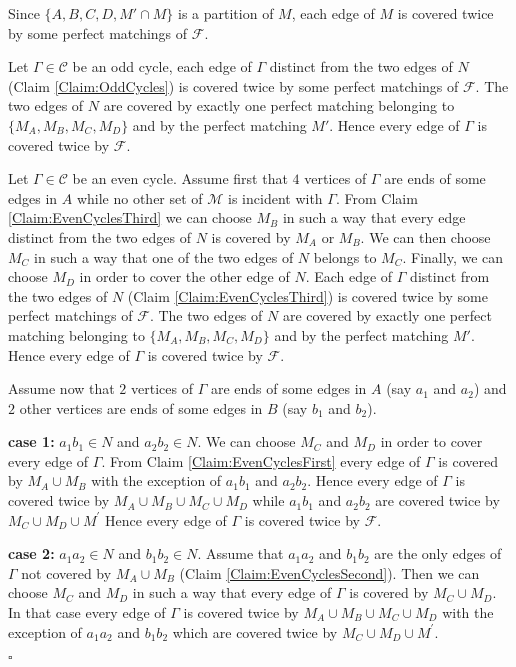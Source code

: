 \documentclass{amsart}
\theoremstyle{definition}
\theoremstyle{remark}
\newenvironment{prf}{{\bf \noindent Proof } }{\hfill$\square$\\}
\begin{document}
\begin{prf}
Since $\{A,B,C,D,M'\cap M\}$ is a partition of $M$, each edge of $M$
is covered twice by some perfect matchings of $\mathcal F$.

Let $\Gamma \in \mathcal C$ be an odd cycle, each edge of $\Gamma$
distinct from the two edges of $N$ (Claim \ref{Claim:OddCycles}) is
covered twice by some perfect matchings of $\mathcal F$. The two
edges of $N$  are covered by exactly one perfect matching belonging
to $\{M_{A},M_{B},M_{C},M_{D}\}$ and by the perfect matching $M'$.
Hence every edge of $\Gamma$ is covered twice by $\mathcal F$.

Let $\Gamma \in \mathcal C$ be an even cycle. Assume first that $4$
vertices of $\Gamma$ are ends of some edges in $A$ while no other
set of $\mathcal M$ is incident with $\Gamma$. From Claim
\ref{Claim:EvenCyclesThird} we can choose $M_{B}$ in such a way that
 every edge distinct from the two edges of $N$  is
covered by  $M_{A}$ or $M_{B}$. We can then choose $M_{C}$ in such a
way that one of the two edges of $N$ belongs to $M_{C}$. Finally, we
can choose $M_{D}$ in order to cover the other edge of $N$. Each
edge of $\Gamma$ distinct from the two edges of $N$ (Claim
 \ref{Claim:EvenCyclesThird}) is
covered twice by some perfect matchings of $\mathcal F$. The two
edges of $N$  are covered by exactly one perfect matching belonging
to $\{M_{A},M_{B},M_{C},M_{D}\}$ and by the perfect matching $M'$.
Hence every edge of $\Gamma$ is covered twice by $\mathcal F$.


Assume now that $2$ vertices of $\Gamma$ are ends of some edges in
$A$ (say $a_{1}$ and $a_{2}$) and $2$ other vertices are ends of
some edges in $B$ (say $b_{1}$ and $b_{2}$).



 {\bf case 1:} $a_{1}b_{1} \in N$ and $a_{2}b_{2} \in N$. We can choose $M_{C}$
and $M_{D}$ in order to cover every edge of $\Gamma$. From Claim
\ref{Claim:EvenCyclesFirst} every edge of $\Gamma$ is covered by
$M_{A} \cup M_{B}$ with the exception of $a_{1}b_{1}$ and
$a_{2}b_{2}$. Hence every edge of $\Gamma$ is covered twice by
$M_{A} \cup M_{B} \cup M_{C} \cup M_{D}$ while $a_{1}b_{1}$ and
$a_{2}b_{2}$ are covered twice by $M_{C} \cup M_{D} \cup M^{'}$
Hence every edge of $\Gamma$ is covered twice by $\mathcal F$.

 {\bf case 2:} $a_{1}a_{2} \in N$ and $b_{1}b_{2} \in N$.
Assume that $a_{1}a_{2}$ and $b_{1}b_{2}$ are the only edges of
$\Gamma$ not covered by $M_{A} \cup M_{B}$ (Claim
\ref{Claim:EvenCyclesSecond}). Then we can choose $M_{C}$ and $M_D$
in such a way that every edge of $\Gamma$ is covered by $M_{C} \cup
M_{D}$. In that case every edge of $\Gamma$ is covered twice by
$M_{A} \cup M_{B} \cup M_{C} \cup M_{D}$ with the exception of
$a_{1}a_{2}$ and $b_{1}b_{2}$ which are covered twice by $M_{C} \cup
M_{D} \cup M^{'}$.


\end{prf}
\end{document}
